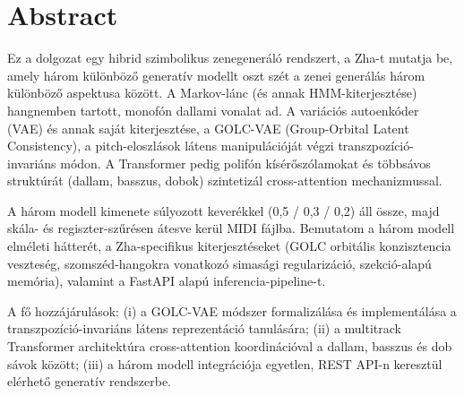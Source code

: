
\chapter{Abstract}

Ez a dolgozat egy hibrid szimbolikus zenegeneráló rendszert, a Zha-t mutatja be, amely három különböző generatív modellt oszt szét a zenei generálás három különböző aspektusa között. A Markov-lánc (és annak HMM-kiterjesztése) hangnemben tartott, monofón dallami vonalat ad. A variációs autoenkóder (VAE) és annak saját kiterjesztése, a GOLC-VAE (Group-Orbital Latent Consistency), a pitch-eloszlások látens manipulációját végzi transzpozíció-invariáns módon. A Transformer pedig polifón kísérőszólamokat és többsávos struktúrát (dallam, basszus, dobok) szintetizál cross-attention mechanizmussal.

A három modell kimenete súlyozott keverékkel (0,5 / 0,3 / 0,2) áll össze, majd skála- és regiszter-szűrésen átesve kerül MIDI fájlba. Bemutatom a három modell elméleti hátterét, a Zha-specifikus kiterjesztéseket (GOLC orbitális konzisztencia veszteség, szomszéd-hangokra vonatkozó simasági regularizáció, szekció-alapú memória), valamint a FastAPI alapú inferencia-pipeline-t.

A fő hozzájárulások: (i) a GOLC-VAE módszer formalizálása és implementálása a transzpozíció-invariáns látens reprezentáció tanulására; (ii) a multitrack Transformer architektúra cross-attention koordinációval a dallam, basszus és dob sávok között; (iii) a három modell integrációja egyetlen, REST API-n keresztül elérhető generatív rendszerbe.